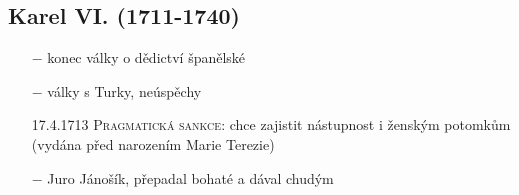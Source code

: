 \documentclass{article}
\begin{document}
\subsection*{Karel VI. (1711-1740)}
\begin{itemize}
    \vspace{-0.5em}
    \setlength\itemsep{0.15em}
    \item[$-$] konec války o dědictví španělské
    \item[$-$] války s Turky, neúspěchy
    \item[17.4.1713] \textsc{Pragmatická sankce}: chce zajistit nástupnost i ženským potomkům (vydána před narozením Marie Terezie)
    \item[$-$] Juro Jánošík, přepadal bohaté a dával chudým
\end{itemize}
\end{document}
